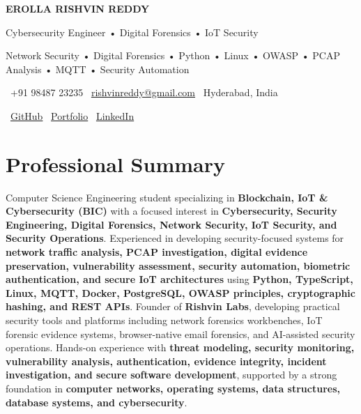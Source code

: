 \documentclass[a4paper,11pt]{article}
\begin{document}

\begin{center}

{\Huge \textbf{EROLLA RISHVIN REDDY}}

\vspace{4pt}

{\large Cybersecurity Engineer • Digital Forensics • IoT Security}

\vspace{5pt}

{\small
Network Security • Digital Forensics • Python • Linux • OWASP • PCAP Analysis • MQTT • Security Automation
}

\vspace{8pt}

\small
\faPhone\ +91 98487 23235
\hspace{12pt}
\faEnvelope\ \href{mailto:rishvinreddy@gmail.com}{rishvinreddy@gmail.com}
\hspace{12pt}
\faMapMarker*\ Hyderabad, India

\vspace{6pt}

\faGithub\
\href{https://github.com/RishvinReddy}{GitHub}
\hspace{14pt}
\faGlobe\
\href{https://rishvinreddy.vercel.app}{Portfolio}
\hspace{14pt}
\faLinkedin\
\href{https://www.linkedin.com/in/rishvinreddy/}{LinkedIn}

\end{center}

\vspace{-8pt}

\section{Professional Summary}

Computer Science Engineering student specializing in \textbf{Blockchain, IoT \& Cybersecurity (BIC)} with a focused interest in \textbf{Cybersecurity, Security Engineering, Digital Forensics, Network Security, IoT Security, and Security Operations}. Experienced in developing security-focused systems for \textbf{network traffic analysis, PCAP investigation, digital evidence preservation, vulnerability assessment, security automation, biometric authentication, and secure IoT architectures} using \textbf{Python, TypeScript, Linux, MQTT, Docker, PostgreSQL, OWASP principles, cryptographic hashing, and REST APIs}. Founder of \textbf{Rishvin Labs}, developing practical security tools and platforms including network forensics workbenches, IoT forensic evidence systems, browser-native email forensics, and AI-assisted security operations. Hands-on experience with \textbf{threat modeling, security monitoring, vulnerability analysis, authentication, evidence integrity, incident investigation, and secure software development}, supported by a strong foundation in \textbf{computer networks, operating systems, data structures, database systems, and cybersecurity}.
\end{document}
